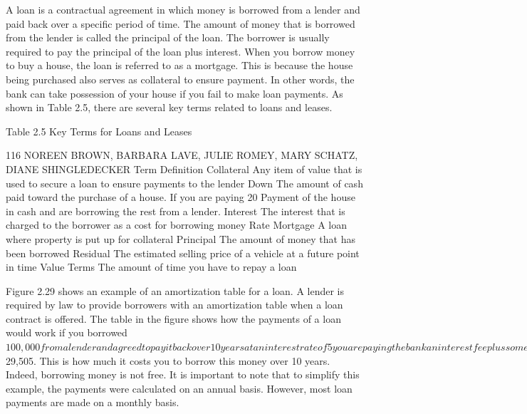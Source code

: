 A loan is a contractual agreement in which money is borrowed from a lender and paid back over
a specific period of time. The amount of money that is borrowed from the lender is called
the principal of the loan. The borrower is usually required to pay the principal of the loan plus
interest. When you borrow money to buy a house, the loan is referred to as a mortgage. This is because
the house being purchased also serves as collateral to ensure payment. In other words, the bank can
take possession of your house if you fail to make loan payments. As shown in Table 2.5, there are
several key terms related to loans and leases.

Table 2.5 Key Terms for Loans and Leases




116 NOREEN BROWN, BARBARA LAVE, JULIE ROMEY, MARY SCHATZ, DIANE SHINGLEDECKER
Term        Definition
Collateral Any item of value that is used to secure a loan to ensure payments to the lender
Down        The amount of cash paid toward the purchase of a house. If you are paying 20%
Payment     of the house in cash and are borrowing the rest from a lender.
Interest
The interest that is charged to the borrower as a cost for borrowing money
Rate
Mortgage A loan where property is put up for collateral
Principal   The amount of money that has been borrowed
Residual
The estimated selling price of a vehicle at a future point in time
Value
Terms       The amount of time you have to repay a loan


Figure 2.29 shows an example of an amortization table for a loan. A lender is required by law to
provide borrowers with an amortization table when a loan contract is offered. The table in the figure
shows how the payments of a loan would work if you borrowed $100,000 from a lender and agreed to
pay it back over 10 years at an interest rate of 5%
you are paying the bank an interest fee plus some of the loan principal. Each year the amount of
interest paid to the bank decreases and the amount of money used to pay off the principal increases.
This is because the bank is charging you interest on the amount of principal that has not been paid. As
you pay off the principal, the interest rate is applied to a lower number, which reduces your interest
charges. Finally, the figure shows that the sum of the values in the Interest Payment column is $29,505.
This is how much it costs you to borrow this money over 10 years. Indeed, borrowing money is not
free. It is important to note that to simplify this example, the payments were calculated on an annual
basis. However, most loan payments are made on a monthly basis.




